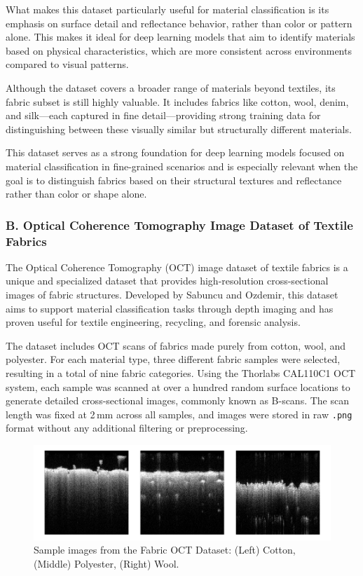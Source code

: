 What makes this dataset particularly useful for material classification is its emphasis on surface detail and reflectance behavior, rather than color or pattern alone. This makes it ideal for deep learning models that aim to identify materials based on physical characteristics, which are more consistent across environments compared to visual patterns.

Although the dataset covers a broader range of materials beyond textiles, its fabric subset is still highly valuable. It includes fabrics like cotton, wool, denim, and silk—each captured in fine detail—providing strong training data for distinguishing between these visually similar but structurally different materials.

This dataset serves as a strong foundation for deep learning models focused on material classification in fine-grained scenarios and is especially relevant when the goal is to distinguish fabrics based on their structural textures and reflectance rather than color or shape alone.

\subsubsection{B. Optical Coherence Tomography Image Dataset of Textile Fabrics~\cite{sabuncu2022optical}}

The Optical Coherence Tomography (OCT) image dataset of textile fabrics is a unique and specialized dataset that provides high-resolution cross-sectional images of fabric structures. Developed by Sabuncu and Ozdemir, this dataset aims to support material classification tasks through depth imaging and has proven useful for textile engineering, recycling, and forensic analysis.

The dataset includes OCT scans of fabrics made purely from cotton, wool, and polyester. For each material type, three different fabric samples were selected, resulting in a total of nine fabric categories. Using the Thorlabs CAL110C1 OCT system, each sample was scanned at over a hundred random surface locations to generate detailed cross-sectional images, commonly known as B-scans. The scan length was fixed at 2\,mm across all samples, and images were stored in raw \texttt{.png} format without any additional filtering or preprocessing.

\begin{figure}[H]
    \centering
    \begin{minipage}{0.8\linewidth}
        \includegraphics[width=\linewidth]{images/FabricOCTDataset.png}
    \end{minipage}
    \caption[Sample images from the Fabric OCT Dataset]{Sample images from the Fabric OCT Dataset: (Left) Cotton, (Middle) Polyester, (Right) Wool.}
\end{figure}

